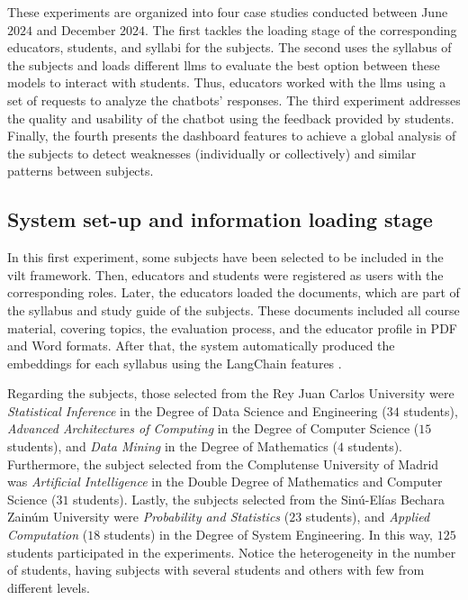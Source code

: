 \documentclass[pdflatex,sn-mathphys-num]{sn-jnl}%
\begin{document}
These experiments are organized into four case studies conducted between June $2024$ and December $2024$. The first tackles the loading stage of the corresponding educators, students, and syllabi for the subjects. The second uses the syllabus of the subjects and loads different \acp{llm} to evaluate the best option between these models to interact with students. Thus, educators worked with the \acp{llm} using a set of requests to analyze the chatbots' responses. The third experiment addresses the quality and usability of the chatbot using the feedback provided by students. Finally, the fourth presents the dashboard features to achieve a global analysis of the subjects to detect weaknesses (individually or collectively) and similar patterns between subjects.

\subsection{System set-up and information loading stage}
\label{sec:setup}
In this first experiment, some subjects have been selected to be included in the \ac{vilt} framework. Then, educators and students were registered as users with the corresponding roles. Later, the educators loaded the documents, which are part of the syllabus and study guide of the subjects. These documents included all course material, covering topics, the evaluation process, and the educator profile in PDF and Word formats. After that, the system automatically produced the embeddings for each syllabus using the LangChain features \cite{auffarth2023generative}.

Regarding the subjects, those selected from the Rey Juan Carlos University were \emph{Statistical Inference} in the Degree of Data Science and Engineering ($34$ students), \emph{Advanced Architectures of Computing} in the Degree of Computer Science ($15$ students), and \emph{Data Mining} in the Degree of Mathematics ($4$ students). Furthermore, the subject selected from the Complutense University of Madrid was \emph{Artificial Intelligence} in the Double Degree of Mathematics and Computer Science ($31$ students). Lastly, the subjects selected from the Sin\'u-El\'ias Bechara Zain\'um University were \emph{Probability and Statistics} ($23$ students), and \emph{Applied Computation} ($18$ students) in the Degree of System Engineering. In this way, $125$ students participated in the experiments. Notice the heterogeneity in the number of students, having subjects with several students and others with few from different levels.
\end{document}
